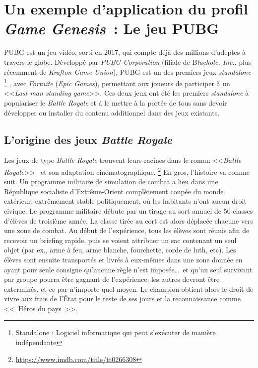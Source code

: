 \chapter{Un exemple d'application du profil \emph{Game Genesis}~: Le jeu PUBG}


PUBG est un jeu vidéo, sorti en 2017, qui compte d\'ej\`a des millions d'adeptes à travers le globe. Développé par \emph{PUBG Corporation} (filiale de B\emph{luehole, Inc.}, plus récemment de \emph{Krafton Game Union}), PUBG est un des premiers jeux \emph{standalone}%
\footnote{Standalone : Logiciel informatique qui peut s'exécuter de manière indépendante}
%
, avec  \emph{Fortnite} (\emph{Epic Games}),
permettant aux joueurs de participer à un <<\emph{Last man standing game}>>. Ces deux jeux ont été les premiers \emph{standalone} à populariser le \emph{Battle Royale} et à le mettre à la portée de tous sans devoir développer ou installer du contenu additionnel dans des jeux existants.



\section{L'origine des jeux \emph{Battle Royale}}



Les jeux de type \emph{Battle Royale} trouvent leurs racines dans le roman <<\emph{Battle Royale}>>~\cite{takami2003battle} et son adaptation cinématographique.%
%
\footnote{\url{https://www.imdb.com/title/tt0266308}}
%
En gros, l'histoire va comme suit.
Un programme militaire de simulation de combat a lieu dans une République socialiste d'Extrême-Orient complètement coupée du monde extérieur, extrêmement stable politiquement, o\`u les habitants n'ont aucun droit civique. Le programme militaire d\'ebute par un tirage au sort annuel de 50 classes d'élèves de troisième année. La classe tirée au cort est alors déplacée chacune vers une zone de combat. Au début de l'expérience, tous les élèves sont réunis afin de recevoir un briefing rapide, puis se voient attribuer un sac contenant un seul objet (par ex., arme à feu, arme blanche, fourchette, corde de luth, etc). Les \'el\`eves sont ensuite transport\'es et livrés à eux-mêmes dans une zone donnée en ayant pour seule consigne qu'aucune règle n'est imposée\ldots\ et qu'un seul survivant par groupe pourra être gagnant de l'expérience;  les autres devront être exterminés, et ce par n'importe quel moyen. Le champion obtient alors le droit de vivre aux frais de l'État pour le reste de ses jours et la reconnaissance comme <<~Héros du pays~>>.

